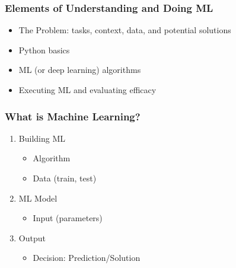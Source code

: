 \documentclass{article}
\begin{document}
\subsubsection*{Elements of Understanding and Doing ML}
\begin{itemize}
    \item The Problem: tasks, context, data, and potential solutions
    \item Python basics
    \item ML (or deep learning) algorithms
    \item Executing ML and evaluating efficacy
\end{itemize}
\subsubsection*{What is Machine Learning?}
\begin{enumerate}
    \item Building ML
    \begin{itemize}
        \item Algorithm
        \item Data (train, test)
    \end{itemize}
    \item ML Model 
    \begin{itemize}
        \item Input (parameters)
    \end{itemize}
    \item Output
    \begin{itemize}
        \item Decision: Prediction/Solution
    \end{itemize}
\end{enumerate}
\end{document}
